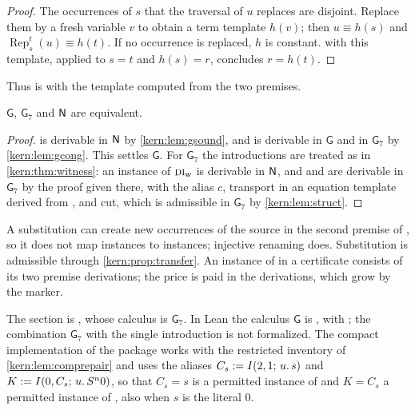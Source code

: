 \begin{proof}
The occurrences of $s$ that the traversal of $u$ replaces are disjoint.
Replace them by a fresh variable $v$ to obtain a term template $h(v)$; then
$u\equiv h(s)$ and $\operatorname{Rep}_{s}^{t}(u)\equiv h(t)$.  If no
occurrence is replaced, $h$ is constant.   with this template,
applied to $s=t$ and $h(s)=r$, concludes $r=h(t)$.
\end{proof}

Thus  is  with the template computed from the two
premises.

\begin{theorem}
\label{kern:thm:tfree}
$\mathsf{G}$, $\mathsf{G}_7$ and $\mathsf{N}$ are equivalent.
\end{theorem}

\begin{proof}
 is derivable in $\mathsf{N}$ by \cref{kern:lem:gsound}, and
 is derivable in $\mathsf{G}$ and in $\mathsf{G}_7$ by
\cref{kern:lem:gcong}.  This settles $\mathsf{G}$.  For $\mathsf{G}_7$ the
introductions are treated as in \cref{kern:thm:witness}: an instance of
$\rulename{DI}_{\mathrm{w}}$ is derivable in $\mathsf{N}$, and  and
 are derivable in $\mathsf{G}_7$ by the proof given there, with
the alias $c$, transport in an equation template derived from ,
and cut, which is admissible in $\mathsf{G}_7$ by \cref{kern:lem:struct}.
\end{proof}

\begin{remark}
\label{kern:rem:tfree}
A substitution can create new occurrences of the source in the second
premise of , so it does not map instances to instances;
injective renaming does.  Substitution is admissible through
\cref{kern:prop:transfer}.  An instance of  in a certificate
consists of its two premise derivations; the price is paid in the
derivations, which grow by the marker.
\end{remark}

\begin{remark}[Sources]
\label{kern:rem:tfree-sources}
The section is , whose calculus is $\mathsf{G}_7$.  In
Lean the calculus $\mathsf{G}$ is , with ;
the combination $\mathsf{G}_7$ with the single introduction is not
formalized.  The compact implementation of the package works with the
restricted inventory of \cref{kern:lem:comprepair} and uses the aliases
$C_s\mathrel{:=}I(2,1;\,u.\,s)$ and $K\mathrel{:=}I(0,C_s;\,u.\,S^{n}0)$, so that
$C_s=s$ is a permitted instance of  and $K=C_s$ a permitted
instance of , also when $s$ is the literal $0$.
\end{remark}

